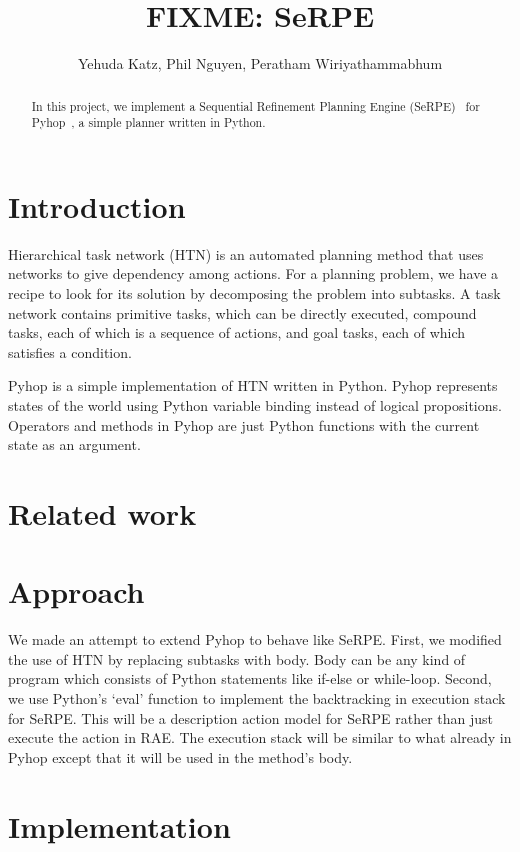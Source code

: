 \documentclass[11pt]{article} %
\title{FIXME: SeRPE}
\author{Yehuda Katz, Phil Nguyen, Peratham Wiriyathammabhum}
\begin{document}
\maketitle

\begin{abstract}
In this project, we implement a Sequential Refinement Planning Engine
(SeRPE)~\cite{disgusting-draft} for Pyhop~\cite{pyhop},
a simple planner written in Python.
\end{abstract}

\section{Introduction}

Hierarchical task network (HTN) is an automated planning method that uses networks
to give dependency among actions.
For a planning problem, we have a recipe to look for its solution
by decomposing the problem into subtasks.
A task network contains primitive tasks, which can be directly executed,
compound tasks, each of which is a sequence of actions,
and goal tasks, each of which satisfies a condition.

Pyhop is a simple implementation of HTN written in Python. 
Pyhop represents states of the world using Python variable binding
 instead of logical propositions. Operators and methods in Pyhop are
 just Python functions with the current state as an argument.



\section{Related work}

\section{Approach}
We made an attempt to extend Pyhop to behave like SeRPE. 
First, we modified the use of HTN by replacing subtasks with 
body. Body can be any kind of program which consists of
 Python statements like if-else or while-loop.
Second, we use Python's `eval' function to implement the 
backtracking in execution stack for SeRPE. This will be a 
description action model for SeRPE rather than just execute
 the action in RAE. The execution stack will be similar to what
 already in Pyhop except that it will be used in the method's body.

\section{Implementation}
\end{document}
